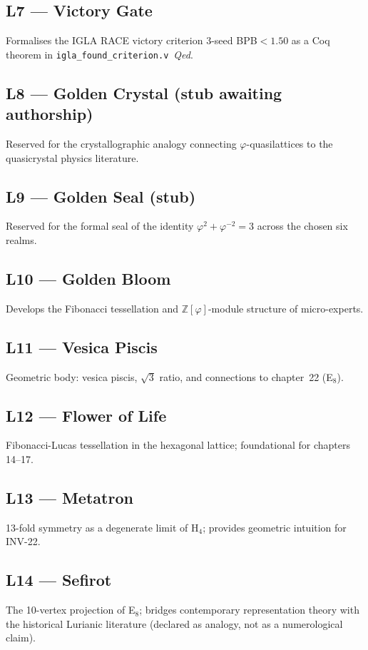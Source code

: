 \subsection*{L7 — Victory Gate} Formalises the IGLA RACE victory criterion
$3$-seed BPB$<\!1{.}50$ as a Coq theorem
 in
\texttt{igla\_found\_criterion.v}~\emph{Qed}.

\subsection*{L8 — Golden Crystal (stub awaiting authorship)} Reserved for the
crystallographic analogy connecting $\varphi$-quasilattices to the
quasicrystal physics literature.

\subsection*{L9 — Golden Seal (stub)} Reserved for the formal seal of the
identity $\varphi^{2}+\varphi^{-2}=3$ across the chosen six realms.

\subsection*{L10 — Golden Bloom} Develops the Fibonacci tessellation and
$\mathbb{Z}[\varphi]$-module structure of micro-experts.

\subsection*{L11 — Vesica Piscis} Geometric body: vesica piscis, $\sqrt{3}$
ratio, and connections to chapter~22 (E$_{8}$).

\subsection*{L12 — Flower of Life} Fibonacci-Lucas tessellation in the
hexagonal lattice; foundational for chapters 14--17.

\subsection*{L13 — Metatron} 13-fold symmetry as a degenerate limit of
H$_{4}$; provides geometric intuition for INV-22.

\subsection*{L14 — Sefirot} The 10-vertex projection of E$_{8}$; bridges
contemporary representation theory with the historical Lurianic
literature (declared as analogy, not as a numerological claim).

